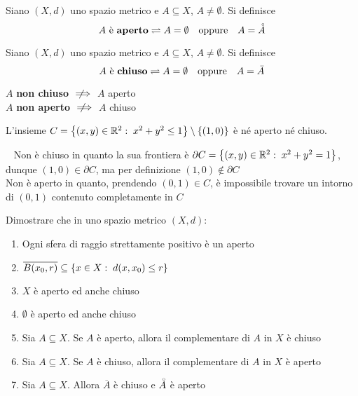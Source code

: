 \begin{definition}
	\label{def:aperto}
	Siano $(X,d)$ uno spazio metrico e $A\subseteq X$, $A \neq \emptyset$. Si definisce
	$$A\text{ è \textbf{aperto}}\rightleftharpoons A=\emptyset\quad\text{oppure}\quad A=\accentset{\circ}{A}$$
\end{definition}
\begin{definition}
	\label{def:chiuso}
	Siano $(X,d)$ uno spazio metrico e $A\subseteq X$, $A \neq \emptyset$. Si definisce
	$$A\text{ è \textbf{chiuso}}\rightleftharpoons A=\emptyset\quad\text{oppure}\quad A=\bar{A}$$
\end{definition}
\begin{observation}
	$A$ \textbf{non chiuso} $\notimplies$ $A$ aperto\\
	$A$ \textbf{non aperto} $\notimplies$ $A$ chiuso
\end{observation}
\begin{example}
	\label{ex:ins_non_ap_non_chius}
	L'insieme $C = \left\{(x,y) \in \mathbb{R}^2:\; x^2+y^2 \leq 1\right\} \setminus \left\{(1,0)\right\}$ è né aperto né chiuso.
	\begin{solution}~\newline
		Non è chiuso in quanto la sua frontiera è $\partial C = \left\{(x,y) \in \mathbb{R}^2:\; x^2+y^2 = 1\right\}$, dunque $(1,0) \in \partial C$, ma per definizione $(1,0) \notin \partial C$\\
		Non è aperto in quanto, prendendo $(0,1) \in C$, è impossibile trovare un intorno di $(0,1)$ contenuto completamente in $C$
	\end{solution}
\end{example}
\begin{exercise}
	Dimostrare che in uno spazio metrico $(X,d)$:
	\begin{enumerate}
		\item Ogni sfera di raggio strettamente positivo è un aperto
		\item $\overline{B(x_0,r)} \subseteq \left\{x \in X:\; d(x,x_0) \leq r\right\}$
		\item $X$ è aperto ed anche chiuso
		\item $\emptyset$ è aperto ed anche chiuso
		\item Sia $A \subseteq X$. Se $A$ è aperto, allora il complementare di $A$ in $X$ è chiuso
		\item Sia $A \subseteq X$. Se $A$ è chiuso, allora il complementare di $A$ in $X$ è aperto
		\item Sia $A \subseteq X$. Allora $\overline{A}$ è chiuso e $\accentset{\circ}{A}$ è aperto
	\end{enumerate}
\end{exercise}
